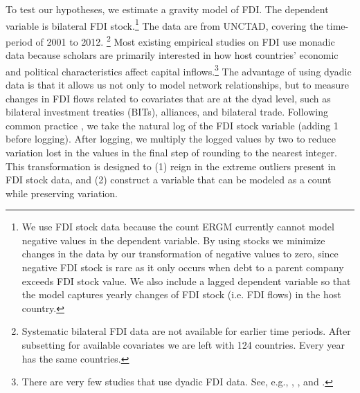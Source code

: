 \documentclass[reqno,onecolumn,letterpaper,12pt]{article}
\begin{document}
To test our hypotheses, we estimate a gravity model of FDI. %
The dependent variable is bilateral FDI stock.\footnote{ We use FDI stock data because the count ERGM currently cannot model negative values in the dependent variable. By using stocks we minimize changes in the data by our transformation of negative values to zero, since negative FDI stock is rare as it only occurs when debt to a parent company exceeds FDI stock value. We also include a lagged dependent variable so that the model captures yearly changes of FDI stock (i.e. FDI flows) in the host country.} The data are from UNCTAD, covering the time-period of 2001 to 2012.%
\footnote{Systematic bilateral FDI data are not available for earlier time periods. After subsetting for available covariates we are left with 124 countries. Every year has the same countries.} Most existing empirical studies on FDI use monadic data because scholars are primarily interested in how host countries' economic and political characteristics affect capital inflows.\footnote{There are very few studies that use dyadic FDI data. See, e.g.,  \citet{Leblang:2010}, \citet{Li_Vashchilko:2010}, and \citet{Razin_et_al:2005}. } The advantage of using dyadic data is that it allows us not only to model network relationships, but to measure changes in FDI flows related to covariates that are at the dyad level, such as bilateral investment treaties (BITs), alliances, and bilateral trade. Following common practice \citep[e.g.,][]{hyun2006quality,benassy2007institutional}, we take the natural log of the FDI stock variable (adding 1 before logging). After logging, we multiply the logged values by two to reduce variation lost in the values in the final step of rounding to the nearest integer. This transformation is designed to (1) reign in the extreme outliers present in FDI stock data, and (2) construct a variable that can be modeled as a count while preserving variation.
\end{document}
